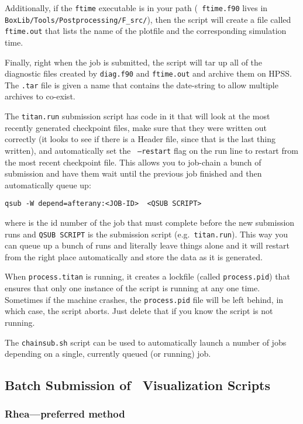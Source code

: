 Additionally, if the {\tt ftime} executable is in your path ({\tt
ftime.f90} lives in {\tt BoxLib/Tools/Postprocessing/F\_src/}), then
the script will create a file called {\tt ftime.out} that lists the
name of the plotfile and the corresponding simulation time.

Finally, right when the job is submitted, the script will tar up all
of the diagnostic files created by {\tt diag.f90} and {\tt ftime.out}
and archive them on HPSS.  The {\tt .tar} file is given a name that
contains the date-string to allow multiple archives to co-exist.

The {\tt titan.run} submission script has code in it that will look at
the most recently generated checkpoint files, make sure that they were
written out correctly (it looks to see if there is a Header file,
since that is the last thing written), and automatically set the {\tt
--restart} flag on the run line to restart from the most recent
checkpoint file.  This allows you to job-chain a bunch of submission
and have them wait until the previous job finished and then
automatically queue up:
\begin{verbatim}
qsub -W depend=afterany:<JOB-ID>  <QSUB SCRIPT>
\end{verbatim}
where {\tt <JOB-ID>} is the id number of the job that must complete
before the new submission runs and {\tt QSUB SCRIPT} is the submission
script (e.g.\ {\tt titan.run}).  This way you can queue up a bunch of
runs and literally leave things alone and it will restart from the
right place automatically and store the data as it is generated.

When {\tt process.titan} is running, it creates a lockfile (called
{\tt process.pid}) that ensures that only one instance of the script
is running at any one time.  Sometimes if the machine crashes, the
{\tt process.pid} file will be left behind, in which case, the script
aborts.  Just delete that if you know the script is not running.

The {\tt chainsub.sh} script can be used to automatically launch a
number of jobs depending on a single, currently queued (or running)
job.


\subsection{Batch Submission of \yt\ Visualization Scripts}

\subsubsection{Rhea---preferred method}

